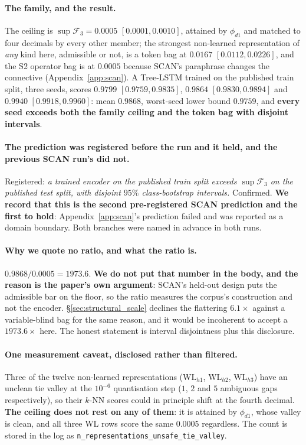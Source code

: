 \paragraph{The family, and the result.} The ceiling is $\sup\mathcal{F}_3 = \mathbf{0.0005}$ $[0.0001,0.0010]$, attained by $\phi_{d1}$ and matched to four decimals by every other member; the strongest non-learned representation of \emph{any} kind here, admissible or not, is a token bag at $0.0167$ $[0.0112,0.0226]$, and the S2 operator bag is at $0.0005$ because SCAN's paraphrase changes the connective (Appendix~\ref{app:scan}). A Tree-LSTM trained on the published train split, three seeds, scores $0.9799$ $[0.9759,0.9835]$, $0.9864$ $[0.9830,0.9894]$ and $0.9940$ $[0.9918,0.9960]$: mean $\mathbf{0.9868}$, worst-seed lower bound $0.9759$, and \textbf{every seed exceeds both the family ceiling and the token bag with disjoint intervals}.

\paragraph{The prediction was registered before the run and it held, and the previous SCAN run's did not.} Registered: \emph{a trained encoder on the published train split exceeds $\sup\mathcal{F}_3$ on the published test split, with disjoint $95\%$ class-bootstrap intervals.} Confirmed. \textbf{We record that this is the second pre-registered SCAN prediction and the first to hold}: Appendix~\ref{app:scan}'s prediction failed and was reported as a domain boundary. Both branches were named in advance in both runs.

\paragraph{Why we quote no ratio, and what the ratio is.} $0.9868 / 0.0005 = 1973.6$. \textbf{We do not put that number in the body, and the reason is the paper's own argument}: SCAN's held-out design puts the admissible bar on the floor, so the ratio measures the corpus's construction and not the encoder. \S\ref{sec:structural_scale} declines the flattering $6.1\times$ against a variable-blind bag for the same reason, and it would be incoherent to accept a $1973.6\times$ here. The honest statement is interval disjointness plus this disclosure.

\paragraph{One measurement caveat, disclosed rather than filtered.} Three of the twelve non-learned representations ($\mathrm{WL}_{h1}$, $\mathrm{WL}_{h2}$, $\mathrm{WL}_{h3}$) have an unclean tie valley at the $10^{-6}$ quantisation step ($1$, $2$ and $5$ ambiguous gaps respectively), so their $k$-NN scores could in principle shift at the fourth decimal. \textbf{The ceiling does not rest on any of them}: it is attained by $\phi_{d1}$, whose valley is clean, and all three WL rows score the same $0.0005$ regardless. The count is stored in the log as \texttt{n\_representations\_unsafe\_tie\_valley}.

